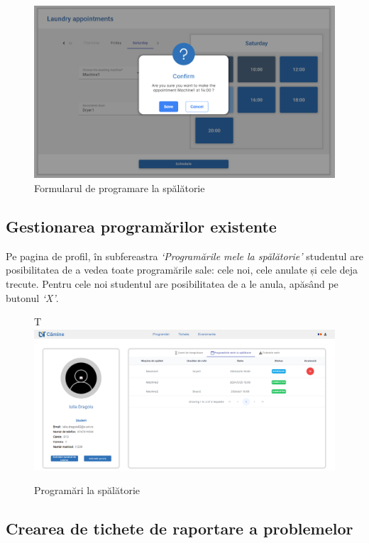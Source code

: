 \documentclass[12pt,a4paper]{report}
\theoremstyle{definition}
\theoremstyle{remark}
\begin{document}
\begin{figure}[H]
    \centering
    \includegraphics[width=0.8\linewidth]{resurse/ghid_utilizare/programare_la_spalatorie.png}
    \caption{Formularul de programare la spălătorie}
\end{figure}

\subsection{Gestionarea programărilor existente}

\par Pe pagina de profil, în subfereastra \textit{`Programările mele la spălătorie'} studentul are posibilitatea de a vedea toate programările sale: cele noi, cele anulate și cele deja trecute. Pentru cele noi studentul are posibilitatea de a le anula, apăsând pe butonul \textit{`X'}.



\begin{figure}[H] T
    \centering
    \includegraphics[width=0.8\linewidth]{resurse/ghid_utilizare/programari_la_spalatorie.png}
    \caption{Programări la spălătorie}
\end{figure}

\subsection{Crearea de tichete de raportare a problemelor}
\end{document}
